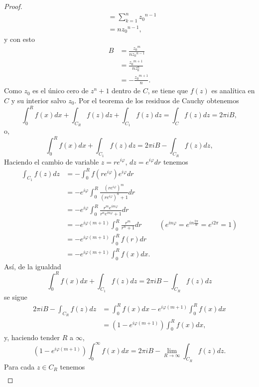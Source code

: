 \begin{proof}
$$\begin{aligned}
                                                            &=\sum_{k=1}^{n}{z_0}^{n-1}\\
                                                            &=n{z_0}^{n-1},
   \end{aligned}
   $$
   y con esto
   $$
   \begin{aligned}
      B&=\frac{{z_0}^m}{n{z_0}^{n-1}}\\
       &=\frac{{z_0}^{m+1}}{n{z_0^n}}\\
       &=-\frac{{z_0}^{m+1}}{n}.
   \end{aligned}
   $$
   Como $z_0$ es el único cero de $z^n+1$ dentro de $C$, se tiene que $f(z)$ es analítica en $C$ y su interior salvo $z_0$. Por el teorema de los residuos de Cauchy obtenemos
   $$
   \int_{0}^{R}f(x)dx+\int_{C_R}f(z)dz+\int_{C_1}f(z)dz=\int_{C}f(z)dz=2\pi i B,
   $$
   o,
   $$
   \int_{0}^{R}f(x)dx+\int_{C_1}f(z)dz=2\pi i B-\int _{C_R}f(z)dz,
   $$
   Haciendo el cambio de variable $z=re^{i\varphi}$, $dz=e^{i\varphi} dr$ tenemos
   $$
   \begin{aligned}
      \int_{C_1}f(z)dz&=-\int_{0}^{R}f(re^{i\varphi})e^{i\varphi} dr\\
                      &=-e^{i\varphi}\int_{0}^{R}\frac{(re^{i\varphi})^m}{(re^{i\varphi})^n+1}dr\\
                      &=-e^{i\varphi}\int_{0}^{R}\frac{r^me^{im\varphi}}{r^ne^{in\varphi}+1}dr\\
                      &=-e^{i\varphi(m+1)}\int_{0}^{R}\frac{r^m}{r^n+1}dr\phantom{00000}(e^{in\varphi}=e^{in\frac{2\pi}{n}}=e^{i2\pi}=1)\\
                      &=-e^{i\varphi(m+1)}\int_{0}^{R}f(r)dr\\
                      &=-e^{i\varphi(m+1)}\int_{0}^{R}f(x)dx.
   \end{aligned}
   $$
   Así, de la igualdad
   $$
   \int_{0}^{R}f(x)dx+\int_{C_1}f(z)dz=2\pi i B-\int _{C_R}f(z)dz
   $$
   se sigue
   $$
   \begin{aligned}
      2\pi i B-\int_{C_R}f(z)dz&=\int_{0}^{R}f(x)dx-e^{i\varphi(m+1)}\int_0^{R}f(x)dx\\
                               &=\left( 1-e^{i\varphi(m+1)}\right)\int_{0}^{R}f(x)dx,
   \end{aligned}
   $$
   y, haciendo tender $R$ a $\infty$,
   $$
   \left( 1-e^{i\varphi(m+1)}\right)\int_{0}^{\infty}f(x)dx=2\pi i B-\lim_{R\to\infty}\int_{C_R}f(z)dz.
   $$
   Para cada $z\in C_R$ tenemos
   $$
   \begin{aligned}

\end{aligned}$$
\end{proof}
